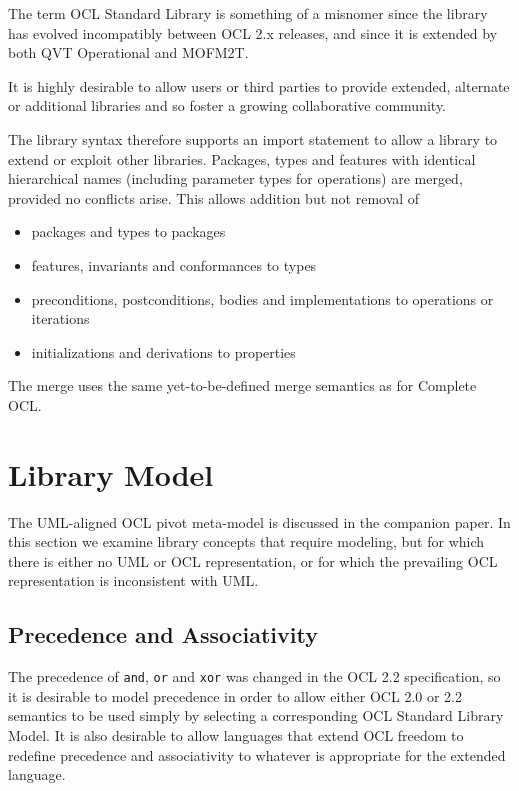 \documentclass{eceasst}
\begin{document}
The term OCL Standard Library is something of a misnomer since the library has evolved incompatibly between OCL 2.x releases, and since it is extended by both QVT Operational and MOFM2T.

It is highly desirable to allow users or third parties to provide extended, alternate or additional libraries and so foster a growing collaborative community.

The library syntax therefore supports an import statement to allow a library to extend or exploit other libraries. Packages, types and features with identical hierarchical names (including parameter types for operations) are merged, provided no conflicts arise. This allows addition but not removal of

\begin{itemize}
\item packages and types to packages
\item features, invariants and conformances to types
\item preconditions, postconditions, bodies and implementations to operations or iterations
\item initializations and derivations to properties
\end{itemize}

The merge uses the same yet-to-be-defined merge semantics as for Complete OCL.

\section{Library Model}\label{LibraryModel}

The UML-aligned OCL pivot meta-model is discussed in the companion paper\cite{OCL-UML}. In this section we examine library concepts that require modeling, but for which there is either no UML or OCL representation, or for which the prevailing OCL representation is inconsistent with UML.

\subsection{Precedence and Associativity}\label{Precedence}

The precedence of \verb|and|, \verb|or| and \verb|xor| was changed in the OCL 2.2 specification, so it is desirable to model precedence in order to allow either OCL 2.0 or 2.2 semantics to be used simply by selecting a corresponding OCL Standard Library Model. It is also desirable to allow languages that extend OCL freedom to redefine precedence and associativity to whatever is appropriate for the extended language.
\end{document}
